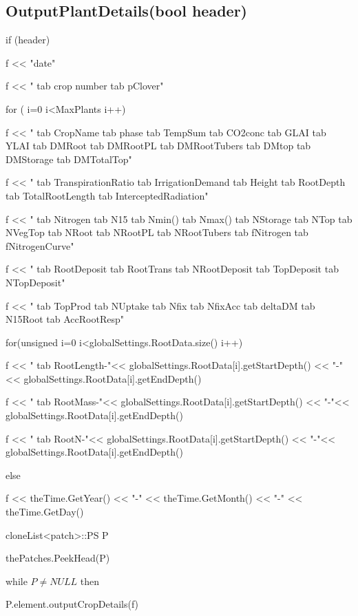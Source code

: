 \documentclass[%
]{scrartcl}
\begin{document}
{{\subsection{OutputPlantDetails(bool header)}	 

if (header)
	
\quad       f << "date"

\quad       f << " tab crop number tab pClover"

 \quad      for ( i=0 i<MaxPlants i++)
      

\quad  \quad    		f << " tab CropName tab phase tab TempSum tab CO2conc tab GLAI tab YLAI tab DMRoot tab DMRootPL tab DMRootTubers tab DMtop tab DMStorage tab DMTotalTop"
 
\quad  \quad    	     	   f << " tab TranspirationRatio tab IrrigationDemand tab Height tab RootDepth tab TotalRootLength tab InterceptedRadiation"

\quad \quad      	   f << " tab Nitrogen tab N15 tab Nmin() tab Nmax() tab NStorage tab NTop tab NVegTop tab NRoot tab NRootPL tab NRootTubers tab fNitrogen tab fNitrogenCurve"
 
\quad  \quad     	   f << " tab RootDeposit tab RootTrans tab NRootDeposit tab TopDeposit tab NTopDeposit"

\quad \quad          f << " tab TopProd tab NUptake tab Nfix tab NfixAcc tab deltaDM tab N15Root tab AccRootResp"
 
\quad         for(unsigned  i=0 i<globalSettings.RootData.size() i++)


\quad  \quad            f << " tab RootLength-"<< globalSettings.RootData[i].getStartDepth() << "-"<< globalSettings.RootData[i].getEndDepth()

\quad  \quad         	f << " tab RootMass-"<< globalSettings.RootData[i].getStartDepth() << "-"<< globalSettings.RootData[i].getEndDepth()
 
\quad  \quad         	f << " tab RootN-"<< globalSettings.RootData[i].getStartDepth() << "-"<< globalSettings.RootData[i].getEndDepth()
     
	
   else
   
    \quad    f << theTime.GetYear() << "-" << theTime.GetMonth() << "-" << theTime.GetDay()

  \quad  cloneList<patch>::PS P
  
  \quad  thePatches.PeekHead(P)
 
 \quad   while $P\ne NULL$ then
  
 \quad    \quad    P.element.outputCropDetails(f)
   
}}
\end{document}
